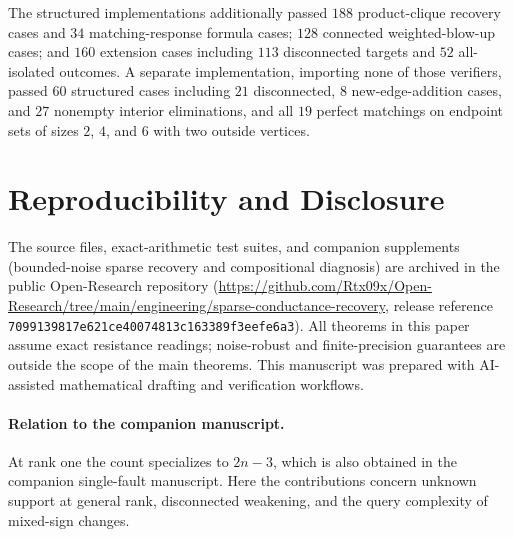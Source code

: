 \documentclass[11pt,letterpaper]{article}
\begin{document}
The structured implementations additionally passed $188$ product-clique recovery cases and $34$ matching-response formula cases; $128$ connected weighted-blow-up cases; and $160$ extension cases including $113$ disconnected targets and $52$ all-isolated outcomes. A separate implementation, importing none of those verifiers, passed $60$ structured cases including $21$ disconnected, $8$ new-edge-addition cases, and $27$ nonempty interior eliminations, and all $19$ perfect matchings on endpoint sets of sizes $2$, $4$, and $6$ with two outside vertices.



\section*{Reproducibility and Disclosure}
The source files, exact-arithmetic test suites, and companion supplements (bounded-noise sparse recovery and compositional diagnosis) are archived in the public Open-Research repository (\url{https://github.com/Rtx09x/Open-Research/tree/main/engineering/sparse-conductance-recovery}, release reference \texttt{7099139817e621ce40074813c163389f3eefe6a3}). All theorems in this paper assume exact resistance readings; noise-robust and finite-precision guarantees are outside the scope of the main theorems. This manuscript was prepared with AI-assisted mathematical drafting and verification workflows.

\paragraph{Relation to the companion manuscript.} At rank one the count specializes to $2n-3$, which is also obtained in the companion single-fault manuscript. Here the contributions concern unknown support at general rank, disconnected weakening, and the query complexity of mixed-sign changes.



\end{document}
